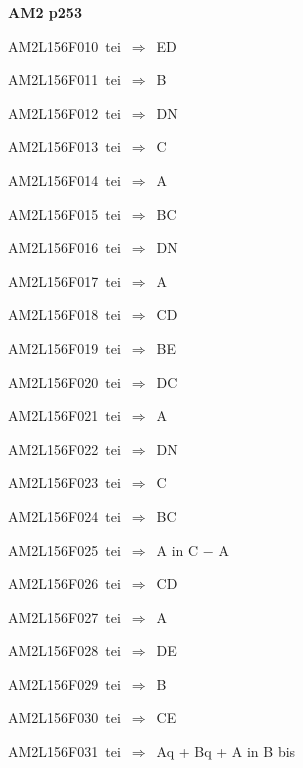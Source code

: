 \par\vfill\eject
{\bf\hfill AM2 p253\hfill\hbox{}}\par\bigskip
{\sixrm AM2L156F010\ {\sixit tei}\ }$\Rightarrow$\ ED\par\smallskip
{\sixrm AM2L156F011\ {\sixit tei}\ }$\Rightarrow$\ {\tenit B}\par\smallskip
{\sixrm AM2L156F012\ {\sixit tei}\ }$\Rightarrow$\ DN\par\smallskip
{\sixrm AM2L156F013\ {\sixit tei}\ }$\Rightarrow$\ {\tenit C}\par\smallskip
{\sixrm AM2L156F014\ {\sixit tei}\ }$\Rightarrow$\ {\tenit A}\par\smallskip
{\sixrm AM2L156F015\ {\sixit tei}\ }$\Rightarrow$\ BC\par\smallskip
{\sixrm AM2L156F016\ {\sixit tei}\ }$\Rightarrow$\ DN\par\smallskip
{\sixrm AM2L156F017\ {\sixit tei}\ }$\Rightarrow$\ {\tenit A}\par\smallskip
{\sixrm AM2L156F018\ {\sixit tei}\ }$\Rightarrow$\ CD\par\smallskip
{\sixrm AM2L156F019\ {\sixit tei}\ }$\Rightarrow$\ BE\par\smallskip
{\sixrm AM2L156F020\ {\sixit tei}\ }$\Rightarrow$\ DC\par\smallskip
{\sixrm AM2L156F021\ {\sixit tei}\ }$\Rightarrow$\ {\tenit A}\par\smallskip
{\sixrm AM2L156F022\ {\sixit tei}\ }$\Rightarrow$\ DN\par\smallskip
{\sixrm AM2L156F023\ {\sixit tei}\ }$\Rightarrow$\ {\tenit C}\par\smallskip
{\sixrm AM2L156F024\ {\sixit tei}\ }$\Rightarrow$\ BC\par\smallskip
{\sixrm AM2L156F025\ {\sixit tei}\ }$\Rightarrow$\ {\tenit A} {\tenit in} {\tenit C} − {\tenit A}\par\smallskip
{\sixrm AM2L156F026\ {\sixit tei}\ }$\Rightarrow$\ CD\par\smallskip
{\sixrm AM2L156F027\ {\sixit tei}\ }$\Rightarrow$\ {\tenit A}\par\smallskip
{\sixrm AM2L156F028\ {\sixit tei}\ }$\Rightarrow$\ DE\par\smallskip
{\sixrm AM2L156F029\ {\sixit tei}\ }$\Rightarrow$\ {\tenit B}\par\smallskip
{\sixrm AM2L156F030\ {\sixit tei}\ }$\Rightarrow$\ CE\par\smallskip
{\sixrm AM2L156F031\ {\sixit tei}\ }$\Rightarrow$\ {\tenit Aq} + {\tenit Bq} + {\tenit A} {\tenit in} {\tenit B} {\tenit bis}\par\smallskip
